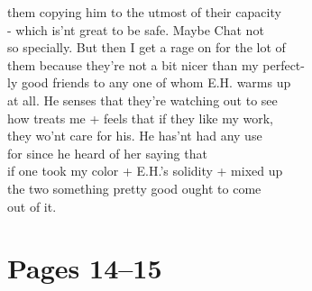 \documentclass[11pt,a4paper]{article}
\begin{document}
{them copying him to the utmost of their capacity \\
- which is'nt great to be safe. Maybe Chat not \\
so specially. But then I get a rage on for the lot of \\
them because they're not a bit nicer than my perfect- \\
ly good friends to any one of whom E.H. warms up \\
at all. He senses that they're watching out to see \\
how treats me + feels that if they like my work, \\
they wo'nt care for his. He has'nt had any use \\
for  since he heard of her saying that \\
if one took my color + E.H.'s solidity + mixed up \\
the two something pretty good ought to come \\
out of it.}




\section{Pages 14--15}
\end{document}
